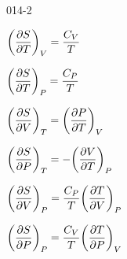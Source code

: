 \begin{mitframe}{014-2}

    
\begin{listone}
        
    \item $\bigg(\dfrac{\partial\entropy}{\partial\Temp}\bigg)_{\vol}=\dfrac{\cv}{\Temp}$
        
    \item$\bigg(\dfrac{\partial\entropy}{\partial\Temp}\bigg)_{\p} = \dfrac{\cp}{\Temp}$
    
    \item $\bigg(\dfrac{\partial\entropy}{\partial\vol}\bigg)_{\Temp} =\bigg(\dfrac{\partial\p}{\partial\Temp}\bigg)_{\vol}$        
   
    \item$\bigg(\dfrac{\partial\entropy}{\partial\p}\bigg)_{\Temp} = -\bigg(\dfrac{\partial\vol}{\partial\Temp}\bigg)_{\p}$
        
    \item $\bigg(\dfrac{\partial\entropy}{\partial\vol}\bigg)_{\p} =\dfrac{\cp}{\Temp}\bigg(\dfrac{\partial\Temp}{\partial\vol}\bigg)_{\p}$
    
    \item$\bigg(\dfrac{\partial\entropy}{\partial\p}\bigg)_{\p} = \dfrac{\cv}{\Temp}\bigg(\dfrac{\partial\Temp}{\partial\p}\bigg)_{\vol}$
    
\end{listone}			

\end{mitframe}